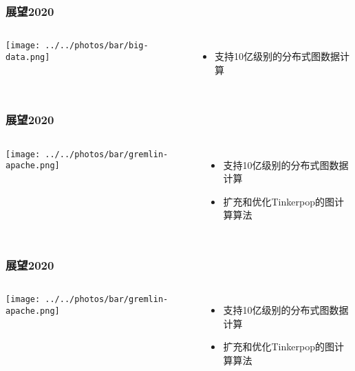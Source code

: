 \documentclass{beamer}
\begin{document}
  \begin{frame}
  \frametitle{展望2020}
    \begin{columns}
        \texttt{[image: ../../photos/bar/big-data.png]}
      \begin{itemize}
        \item 支持10亿级别的分布式图数据计算
      \end{itemize}
    \end{columns}
  \end{frame}

  \begin{frame}
  \frametitle{展望2020}
    \begin{columns}
        \texttt{[image: ../../photos/bar/gremlin-apache.png]}
      \begin{itemize}
        \item 支持10亿级别的分布式图数据计算
        \item 扩充和优化Tinkerpop的图计算算法
      \end{itemize}
    \end{columns}
  \end{frame}

  \begin{frame}
  \frametitle{展望2020}
    \begin{columns}
        \texttt{[image: ../../photos/bar/gremlin-apache.png]}
      \begin{itemize}
        \item 支持10亿级别的分布式图数据计算
        \item 扩充和优化Tinkerpop的图计算算法
      \end{itemize}
    \end{columns}
  \end{frame}
\end{document}
